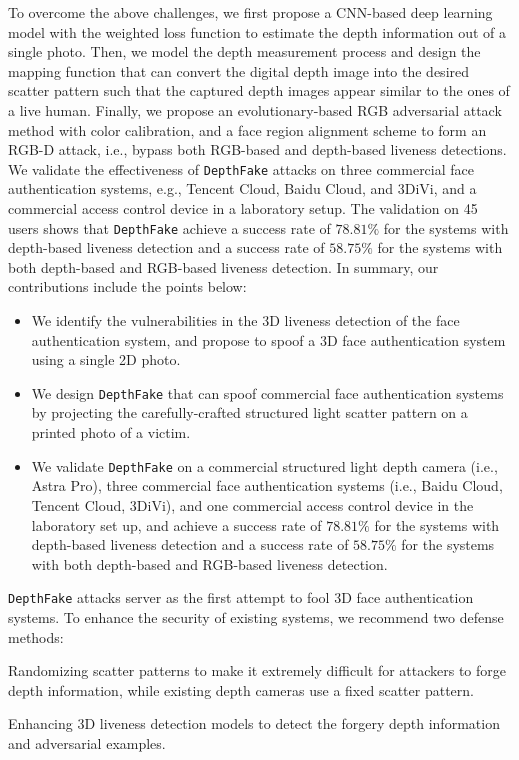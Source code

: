 To overcome the above challenges, we first propose a CNN-based deep learning model with the weighted loss function to estimate the depth information out of a single photo.
Then, we model the depth measurement process and design the mapping function that can convert the digital depth image into the desired scatter pattern such that the captured depth images appear similar to the ones of a live human. 
Finally, we propose an evolutionary-based RGB adversarial attack method with color calibration, and a face region alignment scheme to form an RGB-D attack, i.e., bypass both RGB-based and depth-based liveness detections.
We validate the effectiveness of \texttt{DepthFake} attacks on three commercial face authentication systems, e.g., Tencent Cloud, Baidu Cloud, and 3DiVi, and a commercial access control device in a laboratory setup. The validation on 45 users shows that \texttt{DepthFake} achieve a success rate of $78.81\%$ for the systems with depth-based liveness detection and a success rate of $58.75\%$ for the systems with both depth-based and RGB-based liveness detection. In summary, our contributions include the points below:
\begin{itemize}	
	\item We identify the vulnerabilities in the 3D liveness detection of the face authentication system, and propose to spoof a 3D  face authentication system using a single 2D photo.	
	\item We design \texttt{DepthFake} that can spoof commercial face authentication systems by projecting the carefully-crafted structured light scatter pattern on a printed photo of a victim.	
	\item We validate \texttt{DepthFake} on a commercial structured light depth camera (i.e., Astra Pro), three commercial face authentication systems (i.e., Baidu Cloud, Tencent Cloud, 3DiVi), and one commercial access control device in the laboratory set up, and achieve a success rate of $78.81\%$ for the systems with depth-based liveness detection and a success rate of $58.75\%$ for the systems with both depth-based and RGB-based liveness detection.
\end{itemize}

\texttt{DepthFake} attacks server as the first attempt to fool 3D face authentication systems. To enhance the security of existing systems, we recommend two defense methods:
\begin{inparaenum}
\item Randomizing scatter patterns to make it extremely difficult for attackers to forge depth information, while existing depth cameras use a fixed scatter pattern.
\item  Enhancing 3D liveness detection models to detect the forgery depth information and adversarial examples.
\end{inparaenum}


